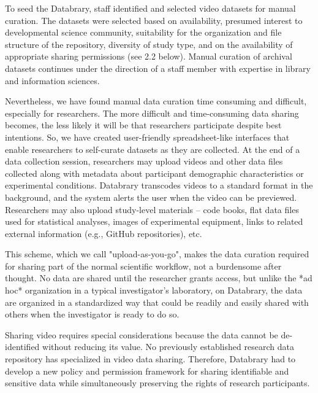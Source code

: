 \documentclass{sig-alternate}
\begin{document}
To seed the Databrary, staff identified and selected video datasets for
manual curation. The datasets were selected based on availability,
presumed interest to developmental science community, suitability for
the organization and file structure of the repository, diversity of
study type, and on the availability of appropriate sharing permissions
(see 2.2 below). Manual curation of archival datasets continues under
the direction of a staff member with expertise in library and
information sciences.

Nevertheless, we have found manual data curation time consuming and
difficult, especially for researchers. The more difficult and
time-consuming data sharing becomes, the less likely it will be that
researchers participate despite best intentions. So, we have created
user-friendly spreadsheet-like interfaces that enable researchers to
self-curate datasets as they are collected. At the end of a data
collection session, researchers may upload videos and other data files
collected along with metadata about participant demographic
characteristics or experimental conditions. Databrary transcodes videos
to a standard format in the background, and the system alerts the user
when the video can be previewed. Researchers may also upload study-level
materials -- code books, flat data files used for statistical analyses,
images of experimental equipment, links to related external information
(e.g., GitHub repositories), etc.

This scheme, which we call "upload-as-you-go", makes the data curation
required for sharing part of the normal scientific workflow, not a
burdensome after thought. No data are shared until the researcher grants
access, but unlike the *ad hoc* organization in a typical investigator's
laboratory, on Databrary, the data are organized in a standardized way
that could be readily and easily shared with others when the
investigator is ready to do so.

Sharing video requires special considerations because the data cannot be
de-identified without reducing its value. No previously established
research data repository has specialized in video data sharing.
Therefore, Databrary had to develop a new policy and permission
framework for sharing identifiable and sensitive data while
simultaneously preserving the rights of research participants.
\end{document}
